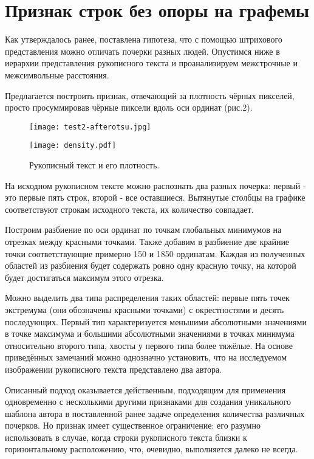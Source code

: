 \documentclass{article}
\begin{document}
\section{Признак строк без опоры на графемы}
Как утверждалось ранее, поставлена гипотеза, что с помощью штрихового представления можно отличать почерки разных людей. Опустимся ниже в иерархии представления рукописного текста и проанализируем межстрочные и межсимвольные расстояния. 

Предлагается построить признак, отвечающий за плотность чёрных пикселей, просто просуммировав чёрные пиксели вдоль оси ординат (рис.2).

\begin{figure}[h]
\begin{minipage}[h]{0.48\linewidth}
    \centering
    \texttt{[image: test2-afterotsu.jpg]} 
\end{minipage}
\hfill
\begin{minipage}[h]{0.48\linewidth}
    \centering
    \texttt{[image: density.pdf]}
\end{minipage}
\caption{Рукописный текст и его плотность.}
\end{figure}

На исходном рукописном тексте можно распознать два разных почерка: первый - это первые пять строк, второй - все оставшиеся. Вытянутые столбцы на графике соответствуют строкам исходного текста, их количество совпадает. 

Построим разбиение по оси ординат по точкам глобальных минимумов на отрезках между красными точками. Также добавим в разбиение две крайние точки соответствующие примерно 150 и 1850 ординатам. Каждая из полученных областей из разбиения будет содержать ровно одну красную точку, на которой будет достигаться максимум этого отрезка.

Можно выделить два типа распределения таких областей: первые пять точек экстремума (они обозначены красными точками) с окрестностями и десять последующих. Первый тип характеризуется меньшими абсолютными значениями в точке максимума и большими абсолютными значениями в точках минимума относительно второго типа, хвосты у первого типа более тяжёлые. На основе приведённых замечаний можно однозначно установить, что на исследуемом изображении рукописного текста представлено два автора. 

Описанный подход оказывается действенным, подходящим для применения одновременно с несколькими другими признаками для создания уникального шаблона автора в поставленной ранее задаче определения количества различных почерков. Но признак имеет существенное ограничение: его разумно использовать в случае, когда строки рукописного текста близки к горизонтальному расположению, что, очевидно, выполняется далеко не всегда.
\end{document}
